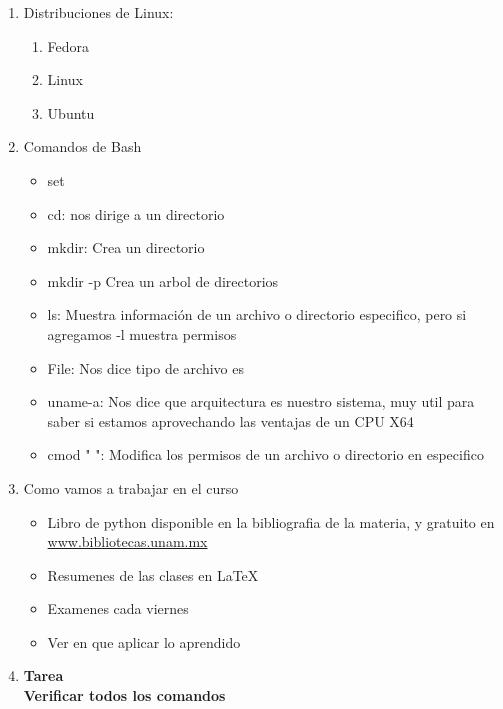 \documentclass{book}
\begin{document}
\begin{enumerate}%
	\item Distribuciones de Linux: %
	\begin{enumerate}%
		\item Fedora
		\item Linux
		\item Ubuntu
	\end{enumerate}%
	\item Comandos de Bash%
	\begin{itemize}%
		\item set
		\item cd: nos dirige a un directorio
		\item mkdir: Crea un directorio
		\item mkdir -p Crea un arbol de directorios
		\item ls: Muestra información de un archivo o directorio especifico, pero si agregamos -l muestra permisos
		\item File: Nos dice tipo de archivo es
		\item uname-a: Nos dice que arquitectura es nuestro sistema, muy util para saber si estamos aprovechando las ventajas de un CPU X64
		\item cmod "   ": Modifica los permisos de un archivo o directorio en especifico
		
	\end{itemize}%
	\item Como vamos a trabajar en el curso
	\begin{itemize}
		\item Libro de python disponible en la bibliografia de la materia, y gratuito en \url{www.bibliotecas.unam.mx}
		\item Resumenes de las clases en LaTeX
		\item Examenes cada viernes
		\item Ver en que aplicar lo aprendido
	\end{itemize}
	\item \textbf{Tarea}
	\\
	\textbf{Verificar todos los comandos}
	
	
	
\end{enumerate}%
\end{document}
